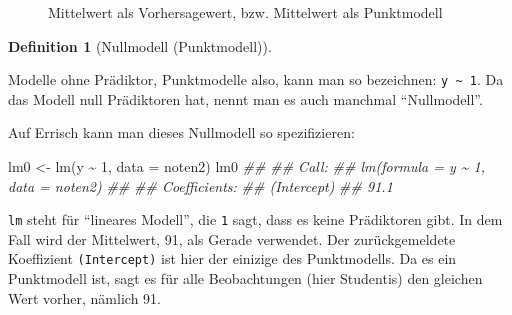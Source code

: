 \documentclass[
  letterpaper,
  twoside,
  open=any]{scrbook}
\newenvironment{Shaded}{\begin{snugshade}}{\end{snugshade}}
\newcommand{\AttributeTok}[1]{\textcolor[rgb]{0.40,0.45,0.13}{#1}}
\newcommand{\DecValTok}[1]{\textcolor[rgb]{0.68,0.00,0.00}{#1}}
\newcommand{\DocumentationTok}[1]{\textcolor[rgb]{0.37,0.37,0.37}{\textit{#1}}}
\newcommand{\FunctionTok}[1]{\textcolor[rgb]{0.28,0.35,0.67}{#1}}
\newcommand{\NormalTok}[1]{\textcolor[rgb]{0.00,0.23,0.31}{#1}}
\newcommand{\OtherTok}[1]{\textcolor[rgb]{0.00,0.23,0.31}{#1}}
\newcommand{\SpecialCharTok}[1]{\textcolor[rgb]{0.37,0.37,0.37}{#1}}
\theoremstyle{definition}
\newtheorem{definition}{Definition}[chapter]
\theoremstyle{definition}
\theoremstyle{definition}
\theoremstyle{remark}
\begin{document}
\begin{figure}


\caption{\label{fig-noten3}Mittelwert als Vorhersagewert, bzw.
Mittelwert als Punktmodell}

\end{figure}%

\begin{definition}[Nullmodell
(Punktmodell)]\protect\hypertarget{def-nullmodell}{}\label{def-nullmodell}

Modelle ohne Prädiktor, Punktmodelle also, kann man so bezeichnen:
\texttt{y\ \textasciitilde{}\ 1}. Da das Modell null Prädiktoren hat,
nennt man es auch manchmal \enquote{Nullmodell}.

\end{definition}

Auf Errisch kann man dieses Nullmodell so spezifizieren:

\begin{Shaded}
\begin{Highlighting}[]
\NormalTok{lm0 }\OtherTok{\textless{}{-}} \FunctionTok{lm}\NormalTok{(y }\SpecialCharTok{\textasciitilde{}} \DecValTok{1}\NormalTok{, }\AttributeTok{data =}\NormalTok{ noten2)}
\NormalTok{lm0}
\DocumentationTok{\#\# }
\DocumentationTok{\#\# Call:}
\DocumentationTok{\#\# lm(formula = y \textasciitilde{} 1, data = noten2)}
\DocumentationTok{\#\# }
\DocumentationTok{\#\# Coefficients:}
\DocumentationTok{\#\# (Intercept)  }
\DocumentationTok{\#\#        91.1}
\end{Highlighting}
\end{Shaded}

\texttt{lm} steht für \enquote{lineares Modell}, die \texttt{1} sagt,
dass es keine Prädiktoren gibt. In dem Fall wird der Mittelwert, 91, als
Gerade verwendet. Der zurückgemeldete Koeffizient \texttt{(Intercept)}
ist hier der einizige des Punktmodells. Da es ein Punktmodell ist, sagt
es für alle Beobachtungen (hier Studentis) den gleichen Wert vorher,
nämlich 91.
\end{document}
